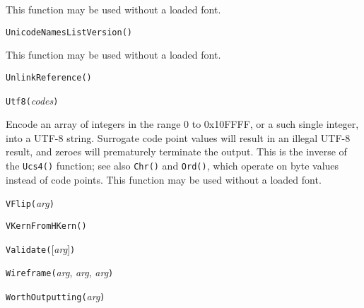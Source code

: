 This function may be used without a loaded font.



\texttt{UnicodeNamesListVersion(}\texttt{)}

This function may be used without a loaded font.



\texttt{UnlinkReference(}\texttt{)}



\texttt{Utf8(}\textit{codes}\texttt{)}

Encode an array of integers in the range 0 to 0x10FFFF, or a such single
integer, into a UTF-8 string.  Surrogate code point values will result in
an illegal UTF-8 result, and zeroes will prematurely terminate the output. 
This is the inverse of the \texttt{Ucs4()} function; see also \texttt{Chr()}
and \texttt{Ord()}, which operate on byte values instead of code points. 
This function may be used without a loaded font.



\texttt{VFlip(}\textit{arg}\texttt{)}



\texttt{VKernFromHKern(}\texttt{)}



\texttt{Validate(}[\textit{arg}]\texttt{)}



\texttt{Wireframe(}\textit{arg}, \textit{arg}, \textit{arg}\texttt{)}



\texttt{WorthOutputting(}\textit{arg}\texttt{)}



